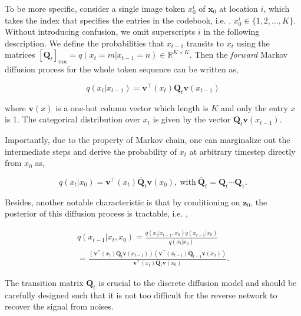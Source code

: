To be more specific, consider a single image token $x^i_0$ of $\bm{x}_0$ at location $i$, which takes the index that specifies the entries in the codebook, i.e. , $x^i_0\in \{1,2,...,K\}$. Without introducing confusion, we omit superscripts $i$ in the following description. We define the probabilities that $x_{t-1}$ transits to $x_t$ using the matrices $[\bm{Q}_t]_{mn}=q(x_t=m|x_{t-1}=n) \in \mathbb{R}^{K\times K}$. Then the \emph{forward} Markov diffusion process for the whole token sequence can be written as,

\begin{equation}

q(x_t|x_{t-1}) = \bm{v}^\top(x_{t})\bm{Q}_t \bm{v}(x_{t-1})
\label{eq:markov}

\end{equation}

where $\bm{v}(x)$ is a one-hot column vector which length is $K$ and only the entry $x$ is 1.  The categorical distribution over $x_t$ is given by the vector $\bm{Q}_t \bm{v}(x_{t-1})$. 

Importantly, due to the property of Markov chain, one can marginalize out the intermediate steps and derive the probability of $x_t$ at arbitrary timestep directly from $x_0$ as,

\begin{equation}
q(x_t|x_0) = \bm{v}^\top(x_{t}) \overline{\bm{Q}}_t \bm{v}(x_0),\  \text{with}\ \overline{\bm{Q}}_t=\bm{Q}_t \cdots \bm{Q}_1.   
\label{eq:forward_chain}
\end{equation}

Besides, another notable characteristic is that by conditioning on $\bm{z}_0$, the posterior of this diffusion process  is tractable, i.e. ,

\begin{equation}

\begin{split}
q(x_{t-1}|x_t,x_0) = \frac{q(x_t|x_{t-1},x_0)q(x_{t-1}|x_0)}{q(x_t|x_0)} \\ 
= \frac{
	\left(\bm{v}^\top(x_{t}) {\bm{Q}}_t \bm{v}(x_{t-1})\right) 
	\left(\bm{v}^\top(x_{t-1}) \overline{\bm{Q}}_{t-1} \bm{v}(x_0)\right)}
	{\bm{v}^\top(x_{t}) \overline{\bm{Q}}_t \bm{v}(x_0)}.
\label{eq:posterior}
\end{split}

\end{equation}

The transition matrix $\bm{Q}_t$ is crucial to the discrete diffusion model and should be carefully designed such that it is not too difficult for the reverse network to recover the signal from noises.

